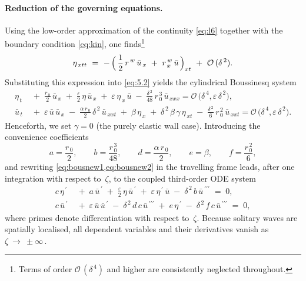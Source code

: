 \documentclass[alpha-refs, 12pt]{wiley-article}
\renewcommand{\O}{\mathcal{O}}
\newcommand{\eps}{\varepsilon}
\begin{document}
\paragraph{Reduction of the governing equations.} Using the low-order approximation of the continuity \cref{eq:l6} together with the boundary condition \eqref{eq:kin}, one finds\footnote{Terms of order $\O\,(\delta^{\,4})$ and higher are consistently neglected throughout.}
\begin{equation*}
  \eta_{\,x t t}\ =\ -\,\Bigl(\,\frac{1}{2}\,r^{\,w}\,\bar{u}_{\,x}\ +\ r^{\,w}_{\,x}\,\bar{u}\,\Bigr)_{x t}\ +\ \O\,(\delta^{\,2}).
\end{equation*}
Substituting this expression into \cref{eq:5.2} yields the cylindrical Boussinesq system
\begin{align}
  \eta_{\,t}
  &\;+\; \frac{r_{\,0}}{2}\,\bar{u}_{\,x}
       \;+\;\frac{\eps}{2}\,\eta\,\bar{u}_{\,x}
       \;+\;\eps\,\eta_{\,x}\,\bar{u}
       \;-\;\frac{\delta^{\,2}}{48}\,r_{\,0}^{\,3}\,\bar{u}_{\,xxx}
       =\O\,\bigl(\delta^{\,4},\eps\,\delta^{\,2}\bigr), 
  \label{eq:bousnew1}\\
  \bar{u}_{\,t}
  &\;+\;\eps\,\bar{u}\,\bar{u}_{\,x}
       \;-\;\frac{\alpha\,r_{\,0}}{2}\,\delta^{\,2}\,\bar{u}_{\,xxt}
       \;+\;\beta\,\eta_{\,x}
       \;+\;\delta^{\,2}\,\beta\,\gamma\,\eta_{\,x t}
       \;-\;\frac{\delta^{\,2}}{6}\,r_{\,0}^{\,2}\,\bar{u}_{\,xxt}
       =\O\,\bigl(\delta^{\,4},\eps\,\delta^{\,2}\bigr).
  \label{eq:bousnew2}
\end{align}
Henceforth, we set $\gamma = 0$ (the purely elastic wall case). Introducing the convenience coefficients
\begin{equation*}
  a=\frac{r_{\,0}}{2}, \qquad
  b=\frac{r_{\,0}^{\,3}}{48}, \qquad
  d=\frac{\alpha\,r_{\,0}}{2}, \qquad
  e=\beta, \qquad
  f=\frac{r_{\,0}^{\,2}}{6},
\end{equation*}
and rewriting \cref{eq:bousnew1,eq:bousnew2} in the travelling frame leads, after one integration with respect to~$\zeta$, to the coupled third-order ODE system
\begin{align}
  c\,\eta^{\,\prime}
  &\;+\;a\,\bar{u}^{\,\prime}
       \;+\;\frac{\eps}{2}\,\eta\,\bar{u}^{\,\prime}
       \;+\;\eps\,\eta^{\,\prime}\,\bar{u}
       \;-\;\delta^{\,2}\,b\,\bar{u}^{\,\prime\prime\prime}
       \;=\;0,
  \label{eq:5.9a} \\
  c\,\bar{u}^{\,\prime}
  &\;+\;\eps\,\bar{u}\,\bar{u}^{\,\prime}
       \;-\;\delta^{\,2}\,d\,c\,\bar{u}^{\,\prime\prime\prime}
       \;+\;e\,\eta^{\,\prime}
       \;-\;\delta^{\,2}\,f\,c\,\bar{u}^{\,\prime\prime\prime}
       \;=\;0,
  \label{eq:5.10a}
\end{align}
where primes denote differentiation with respect to~$\zeta$. Because solitary waves are spatially localised, all dependent variables and their derivatives vanish as $\zeta\ \to\ \pm\infty\,$.
\end{document}
